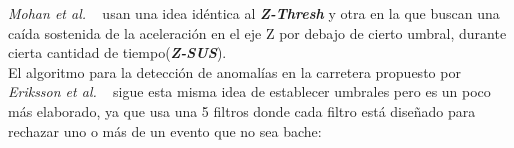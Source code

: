 		\emph{Mohan et al.} ~ usan una idea idéntica al \emph{\textbf{Z-Thresh}} y otra en la que buscan
		una caída sostenida de la aceleración en el eje Z por debajo de cierto umbral, durante cierta cantidad de tiempo(\emph{\textbf{Z-SUS}}).\\





		El algoritmo para la detección de anomalías en la carretera propuesto por \emph{Eriksson et al.} ~ sigue
		esta misma idea de establecer umbrales pero es un poco más elaborado, ya que usa una 5 filtros donde cada filtro está diseñado
		para rechazar uno o más de un evento que no sea bache:\\

